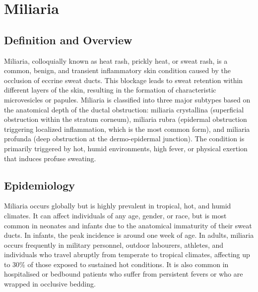 \chapter{Miliaria}

\section*{Definition and Overview}
Miliaria, colloquially known as heat rash, prickly heat, or sweat rash, is a common, benign, and transient inflammatory skin condition caused by the occlusion of eccrine sweat ducts. This blockage leads to sweat retention within different layers of the skin, resulting in the formation of characteristic microvesicles or papules. Miliaria is classified into three major subtypes based on the anatomical depth of the ductal obstruction: miliaria crystallina (superficial obstruction within the stratum corneum), miliaria rubra (epidermal obstruction triggering localized inflammation, which is the most common form), and miliaria profunda (deep obstruction at the dermo-epidermal junction). The condition is primarily triggered by hot, humid environments, high fever, or physical exertion that induces profuse sweating.

\section*{Epidemiology}
Miliaria occurs globally but is highly prevalent in tropical, hot, and humid climates. It can affect individuals of any age, gender, or race, but is most common in neonates and infants due to the anatomical immaturity of their sweat ducts. In infants, the peak incidence is around one week of age. In adults, miliaria occurs frequently in military personnel, outdoor labourers, athletes, and individuals who travel abruptly from temperate to tropical climates, affecting up to 30\% of those exposed to sustained hot conditions. It is also common in hospitalised or bedbound patients who suffer from persistent fevers or who are wrapped in occlusive bedding.

